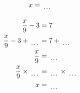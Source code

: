 \documentclass[12pt]{article}
\newcounter{minipagecount}
\begin{document}
\begin{multicols}{2}
\begin{minipage}[t]{0.45\textwidth}
\begin{align*}
        x &= \dotuline{\hspace{5mm}}\\
    \end{align*}
\end{minipage} %
\noindent{(\theminipagecount)}\hspace{0.1mm} %
\begin{minipage}[t]{0.45\textwidth} %
    \vspace{-26pt}  %
    \raggedright %
    \begin{align*} %
        \frac{x}{9} - 3 &= 7\\
        \frac{x}{9} - 3 + \dotuline{\hspace{5mm}} &= 7 + \dotuline{\hspace{5mm}}\\
        \frac{x}{9} &= \dotuline{\hspace{5mm}}\\
        \frac{x}{9} \times\dotuline{\hspace{5mm}} &= \dotuline{\hspace{5mm}} \times\dotuline{\hspace{5mm}}\\
        x &= \dotuline{\hspace{5mm}}\\
    \end{align*}
\end{minipage}\newpage
\noindent{(\theminipagecount)}\hspace{0.1mm} %
\begin{minipage}[t]{0.45\textwidth} %
    \vspace{-26pt}  %

\end{minipage}
\end{multicols}
\end{document}
